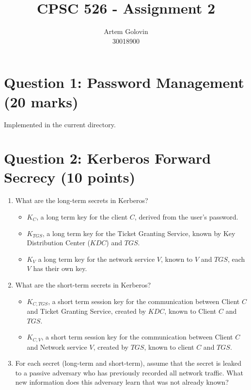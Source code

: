 \documentclass[11pt]{article}
\title{CPSC 526 - Assignment 2}
\author{Artem Golovin \\ 30018900}
\begin{document}
\maketitle

\section*{Question 1: Password Management (20 marks)}

Implemented in the current directory.

\section*{Question 2: Kerberos Forward Secrecy (10 points)}

\begin{enumerate}
    \item What are the long-term secrets in Kerberos?

    \begin{itemize}
      \item $K_{C}$, a long term key for the client $C$, derived from the user's password.
      \item $K_{TGS}$, a long term key for the Ticket Granting Service, known by Key Distribution Center ($KDC$) and $TGS$.
      \item $K_{V}$ a long term key for the network service $V$, known to $V$ and $TGS$, each $V$ has their own key.
    \end{itemize}

    \item What are the short-term secrets in Kerberos?

    \begin{itemize}
      \item $K_{C, TGS}$, a short term session key for the communication between Client $C$ and Ticket Granting Service, created by $KDC$, known to Client $C$ and $TGS$.
      \item $K_{C, V}$, a short term session key for the communication between Client $C$ and Network service $V$, created by $TGS$, known to client $C$ and $TGS$.
    \end{itemize}

    \item For each secret (long-term and short-term), assume that the secret is leaked to a passive adversary who has previously recorded all network traffic. What new information does this adversary learn that was not already known?
    

\end{enumerate}
\end{document}
